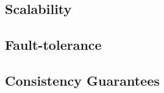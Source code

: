 \documentclass[]{article}
\newcommand{\subtopic}[1]{\vspace{1.5pt} \noindent \textbf{#1}}
\begin{document}
\subsection{Scalability}

\subsection{Fault-tolerance}

\subsection{Consistency Guarantees}




\end{document}
